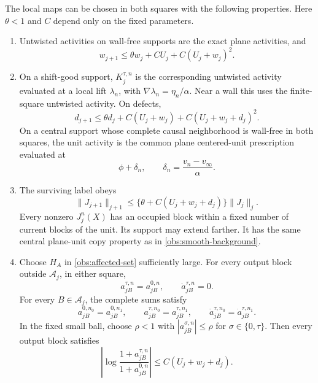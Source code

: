 \begin{lemma}\label{obs:local-estimates}
The local maps can be chosen in both squares with the following
properties.  Here \(\theta<1\) and \(C\) depend only on the fixed
parameters.
\begin{enumerate}
\item Untwisted activities on wall-free supports are the exact plane
activities, and
\begin{equation}\label{obs:wall-recurrence}
 w_{j+1}\le \theta w_j+C U_j+C(U_j+w_j)^2.
\end{equation}
\item On a shift-good support, \(K_j^{\tau,n}\) is the corresponding
untwisted activity evaluated at a local lift \(\lambda_n\), with
\(\nabla\lambda_n=\eta_n/\alpha\).  Near a wall this uses the
finite-square untwisted activity.  On defects,
\begin{equation}\label{obs:defect-recurrence}
 d_{j+1}\le\theta d_j+C(U_j+w_j)+C(U_j+w_j+d_j)^2.
\end{equation}
On a central support whose complete causal neighborhood is wall-free
in both squares, the unit activity is the common plane centered-unit
prescription evaluated at
\begin{equation}\label{obs:smooth-background}
                     \phi+\delta_n,\qquad
          \delta_n=\frac{v_n-v_\infty}{\alpha}.
\end{equation}
\item The surviving label obeys
\begin{equation}\label{obs:label-recurrence}
 \|J_{j+1}\|_{j+1}
 \le \{\theta+C(U_j+w_j+d_j)\}\|J_j\|_j.
\end{equation}
Every nonzero \(J_j^n(X)\) has an occupied block within a fixed number
of current blocks of the unit.  Its support may extend farther.
It has the same central plane-unit copy property as in
\eqref{obs:smooth-background}.
\item Choose \(H_A\) in \eqref{obs:affected-set} sufficiently large.
For every output block outside \(\mathcal A_j\), in either square,
\begin{equation}\label{obs:factor-outside}
 a_{jB}^{\tau,n}=a_{jB}^{0,n},\qquad
                  \dot a_{jB}^{\tau,n}=0.
\end{equation}
For every \(B\in\mathcal A_j\), the complete sums satisfy
\begin{equation}\label{obs:factor-copy}
 a_{jB}^{0,n_0}=a_{jB}^{0,n_1},\qquad
 a_{jB}^{\tau,n_0}=a_{jB}^{\tau,n_1},\qquad
 \dot a_{jB}^{\tau,n_0}=\dot a_{jB}^{\tau,n_1}.
\end{equation}
In the fixed small ball, choose \(\rho<1\) with
\(|a_{jB}^{\sigma,n}|\le\rho\) for \(\sigma\in\{0,\tau\}\).
Then every output block satisfies
\begin{equation}\label{obs:scalar-log-bound}
 \left|\log\frac{1+a_{jB}^{\tau,n}}{1+a_{jB}^{0,n}}\right|
       \le C(U_j+w_j+d_j).
\end{equation}
\end{enumerate}
\end{lemma}

